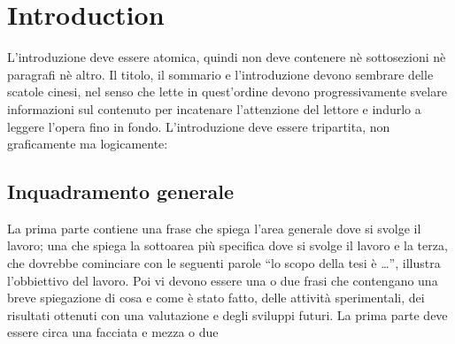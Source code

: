 
\chapter{Introduction}
\label{chap:introdction}


%
%
%






%
%


\noindent L'introduzione deve essere atomica, quindi non deve contenere n\`e sottosezioni n\`e paragrafi n\`e altro. Il titolo, il sommario e l'introduzione devono sembrare delle scatole cinesi, nel senso che lette in quest'ordine devono progressivamente svelare informazioni sul contenuto per incatenare l'attenzione del lettore e indurlo a leggere l'opera fino in fondo. L'introduzione deve essere tripartita, non graficamente ma logicamente:

\section{Inquadramento generale}
La prima parte contiene una frase che spiega l'area generale dove si svolge il lavoro; una che spiega la sottoarea pi\`u specifica dove si svolge il lavoro e la terza, che dovrebbe cominciare con le seguenti parole ``lo scopo della tesi \`e \dots'', illustra l'obbiettivo del lavoro. Poi vi devono essere una o due frasi che contengano una breve spiegazione di cosa e come \`e stato fatto, delle attività sperimentali, dei risultati ottenuti con una valutazione e degli sviluppi futuri. La prima parte deve essere circa una facciata e mezza o due

